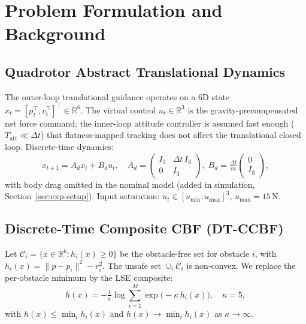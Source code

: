 \documentclass[11pt,onecolumn,a4paper]{article}
\newcommand{\R}{\mathbb{R}}
\newcommand{\dt}{\Delta t}
\begin{document}
\section{Problem Formulation and Background}\label{sec:problem}

\subsection{Quadrotor Abstract Translational Dynamics}

The outer-loop translational guidance operates on a 6D state
$x_t = [p_t^\top, v_t^\top]^\top \in \R^6$. The virtual control
$u_t \in \R^3$ is the gravity-precompensated net force command; the
inner-loop attitude controller is assumed fast enough
($T_{\mathrm{att}} \ll \dt$) that flatness-mapped tracking does not
affect the translational closed loop. Discrete-time dynamics:
\begin{equation}\label{eq:dyn}
x_{t+1} = A_d x_t + B_d u_t,\quad
A_d = \begin{pmatrix} I_3 & \dt\, I_3 \\ 0 & I_3 \end{pmatrix},\;
B_d = \tfrac{\dt}{m} \begin{pmatrix} 0 \\ I_3 \end{pmatrix},
\end{equation}
with body drag omitted in the nominal model (added in simulation,
Section~\ref{sec:exp-setup}). Input saturation:
$u_t \in [u_{\min}, u_{\max}]^3$, $u_{\max} = 15\,\mathrm{N}$.

\subsection{Discrete-Time Composite CBF (DT-CCBF)}

Let $\mathcal{C}_i = \{x \in \R^6 : h_i(x) \ge 0\}$ be the
obstacle-free set for obstacle $i$, with $h_i(x) = \|p - p_i\|^2 - r_i^2$.
The unsafe set $\cup_i \overline{\mathcal{C}}_i$ is non-convex. We
replace the per-obstacle minimum by the LSE composite:
\begin{equation}\label{eq:lse}
h(x) = -\tfrac{1}{\kappa} \log \sum_{i=1}^{M}
\exp\!\big(-\kappa\, h_i(x)\big), \quad \kappa = 5,
\end{equation}
with $h(x) \le \min_i h_i(x)$ and $h(x) \to \min_i h_i(x)$ as
$\kappa \to \infty$.
\end{document}
